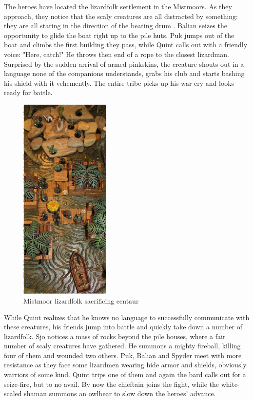 The heroes have located the lizardfolk settlement in the Mistmoors. As they approach, they notice that the scaly creatures are all distracted by something:\hyperref[fig:Mistmoor-lizardfolk-sacrificing-centaur-543065415]{ they are all staring in the direction of the beating drum } . Balian seizes the opportunity to glide the boat right up to the pile huts. Puk jumps out of the boat and climbs the first building they pass, while Quint calls out with a friendly voice: "Here, catch!" He throws then end of a rope to the closest lizardman. Surprised by the sudden arrival of armed pinkskins, the creature shouts out in a language none of the companions understands, grabs his club and starts bashing his shield with it vehemently. The entire tribe picks up his war cry and looks ready for battle. \\

\begin{figure}[h]
	\centering
	\includegraphics[width=0.4\textwidth]{images/Mistmoor-lizardfolk-sacrificing-centaur-543065415_mod.jpg}
	\caption{Mistmoor lizardfolk sacrificing centaur}
	\label{fig:Mistmoor-lizardfolk-sacrificing-centaur-543065415}
\end{figure}

While Quint realizes that he knows no language to successfully communicate with these creatures, his friends jump into battle and quickly take down a number of lizardfolk. Sjo notices a mass of rocks beyond the pile houses, where a fair number of scaly creatures have gathered. He summons a mighty fireball, killing four of them and wounded two others. Puk, Balian and Spyder meet with more resistance as they face some lizardmen wearing hide armor and shields, obviously warriors of some kind. Quint trips one of them and again the bard calls out for a seize-fire, but to no avail. By now the chieftain joins the fight, while the white-scaled shaman summons an owlbear to slow down the heroes' advance.\\


